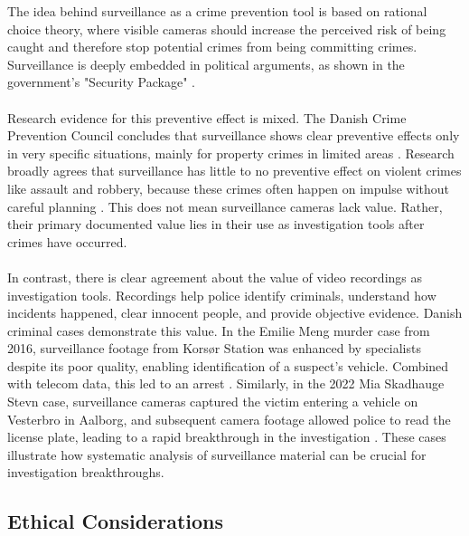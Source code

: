 The idea behind surveillance as a crime prevention tool is based on rational choice theory, where visible cameras should increase the perceived risk of being caught and therefore stop potential crimes from being committing crimes. Surveillance is deeply embedded in political arguments, as shown in the government's "Security Package" \cite{tryghedspakke2019}.
\\\\
Research evidence for this preventive effect is mixed. The Danish Crime Prevention Council concludes that surveillance shows clear preventive effects only in very specific situations, mainly for property crimes in limited areas \cite{dkr_tv_overvaagning}. Research broadly agrees that surveillance has little to no preventive effect on violent crimes like assault and robbery, because these crimes often happen on impulse without careful planning \cite{videnskab2024}. This does not mean surveillance cameras lack value. Rather, their primary documented value lies in their use as investigation tools after crimes have occurred.
\\\\
In contrast, there is clear agreement about the value of video recordings as investigation tools. Recordings help police identify criminals, understand how incidents happened, clear innocent people, and provide objective evidence. Danish criminal cases demonstrate this value. In the Emilie Meng murder case from 2016, surveillance footage from Korsør Station was enhanced by specialists despite its poor quality, enabling identification of a suspect's vehicle. Combined with telecom data, this led to an arrest \cite{emilie_meng_avisen,emilie_meng_wiki}. Similarly, in the 2022 Mia Skadhauge Stevn case, surveillance cameras captured the victim entering a vehicle on Vesterbro in Aalborg, and subsequent camera footage allowed police to read the license plate, leading to a rapid breakthrough in the investigation \cite{mia_stevn_avisen}. These cases illustrate how systematic analysis of surveillance material can be crucial for investigation breakthroughs.

\subsection{Ethical Considerations}

